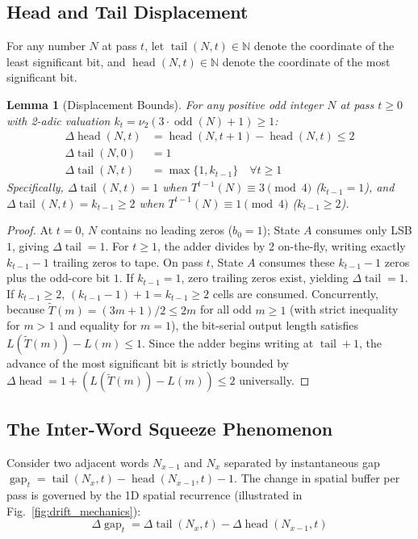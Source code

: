 \documentclass[journal,10pt,twocolumn]{IEEEtran}
\newtheorem{lemma}{Lemma}
\DeclareMathOperator{\tail}{tail}
\DeclareMathOperator{\head}{head}
\DeclareMathOperator{\gap}{gap}
\DeclareMathOperator{\oddcore}{odd}
\begin{document}
\subsection{Head and Tail Displacement}
For any number $N$ at pass $t$, let $\tail(N, t) \in \mathbb{N}$ denote the coordinate of the least significant bit, and $\head(N, t) \in \mathbb{N}$ denote the coordinate of the most significant bit.

\begin{lemma}[Displacement Bounds]
For any positive odd integer $N$ at pass $t \ge 0$ with 2-adic valuation $k_t = \nu_2(3 \cdot \oddcore(N) + 1) \ge 1$:
\begin{align}
\Delta \head(N, t) &= \head(N, t+1) - \head(N, t) \le 2 \label{eq:head_disp} \\
\Delta \tail(N, 0) &= 1 \label{eq:tail_disp_0} \\
\Delta \tail(N, t) &= \max\{1, k_{t-1}\} \quad \forall t \ge 1 \label{eq:tail_disp_t}
\end{align}
Specifically, $\Delta \tail(N, t) = 1$ when $T^{t-1}(N) \equiv 3 \pmod 4$ ($k_{t-1} = 1$), and $\Delta \tail(N, t) = k_{t-1} \ge 2$ when $T^{t-1}(N) \equiv 1 \pmod 4$ ($k_{t-1} \ge 2$).
\end{lemma}
\begin{proof}
At $t=0$, $N$ contains no leading zeros ($b_0 = 1$); State $A$ consumes only LSB $1$, giving $\Delta \tail = 1$. For $t \ge 1$, the adder divides by 2 on-the-fly, writing exactly $k_{t-1} - 1$ trailing zeros to tape. On pass $t$, State $A$ consumes these $k_{t-1}-1$ zeros plus the odd-core bit $1$. If $k_{t-1} = 1$, zero trailing zeros exist, yielding $\Delta \tail = 1$. If $k_{t-1} \ge 2$, $(k_{t-1}-1)+1 = k_{t-1} \ge 2$ cells are consumed. Concurrently, because $\widetilde{T}(m) = (3m+1)/2 \le 2m$ for all odd $m \ge 1$ (with strict inequality for $m > 1$ and equality for $m=1$), the bit-serial output length satisfies $L(\widetilde{T}(m)) - L(m) \le 1$. Since the adder begins writing at $\tail + 1$, the advance of the most significant bit is strictly bounded by $\Delta \head = 1 + (L(\widetilde{T}(m)) - L(m)) \le 2$ universally.
\end{proof}

\subsection{The Inter-Word Squeeze Phenomenon}
Consider two adjacent words $N_{x-1}$ and $N_x$ separated by instantaneous gap $\gap_t = \tail(N_x, t) - \head(N_{x-1}, t) - 1$. The change in spatial buffer per pass is governed by the 1D spatial recurrence (illustrated in Fig.~\ref{fig:drift_mechanics}):
\begin{equation}
\Delta \gap_t = \Delta \tail(N_x, t) - \Delta \head(N_{x-1}, t)
\label{eq:gap_evolution}
\end{equation}
\end{document}
